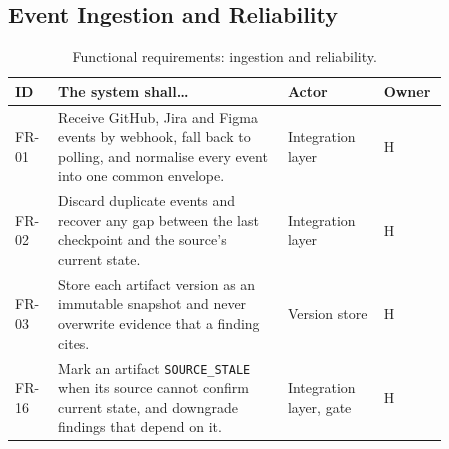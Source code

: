 \newcommand{\frhead}{%
  \hline \textbf{ID} & \textbf{The system shall\ldots} & \textbf{Actor} & \textbf{Owner} \\ \hline}

\subsection{Event Ingestion and Reliability}
\begin{longtable}{>{\raggedright\arraybackslash}p{0.09\linewidth} >{\raggedright\arraybackslash}p{0.48\linewidth} >{\raggedright\arraybackslash}p{0.2\linewidth} >{\raggedright\arraybackslash}p{0.09\linewidth}}
\caption{Functional requirements: ingestion and reliability.}\\
\frhead
FR-01 & Receive GitHub, Jira and Figma events by webhook, fall back to polling,
        and normalise every event into one common envelope. & Integration layer & H \\
FR-02 & Discard duplicate events and recover any gap between the last
        checkpoint and the source's current state. & Integration layer & H \\
FR-03 & Store each artifact version as an immutable snapshot and never overwrite
        evidence that a finding cites. & Version store & H \\
FR-16 & Mark an artifact \texttt{SOURCE\_STALE} when its source cannot confirm
        current state, and downgrade findings that depend on it. & Integration layer, gate & H \\
\hline
\end{longtable}

